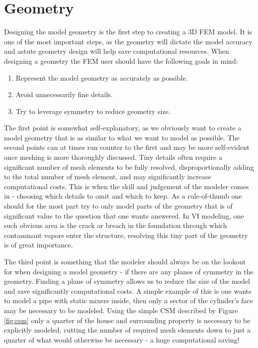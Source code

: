 \section{Geometry}

Designing the model geometry is the first step to creating a 3D FEM model.
It is one of the most important steps, as the geometry will dictate the model accuracy and astute geometry design will help save computational resources.
When designing a geometry the FEM user should have the following goals in mind:
\begin{enumerate}
  \item Represent the model geometry as accurately as possible.
  \item Avoid unnecessarily fine details.
  \item Try to leverage symmetry to reduce geometry size.
\end{enumerate}\par

The first point is somewhat self-explanatory, as we obviously want to create a model geometry that is as similar to what we want to model as possible.
The second points can at times run counter to the first and may be more self-evident once meshing is more thoroughly discussed.
Tiny details often require a significant number of mesh elements to be fully resolved, disproportionally adding to the total number of mesh element, and may significantly increase computational costs.
This is when the skill and judgement of the modeler comes in - choosing which details to omit and which to keep.
As a rule-of-thumb one should for the most part try to only model parts of the geometry that is of significant value to the question that one wants answered.
In VI modeling, one such obvious area is the crack or breach in the foundation through which contaminant vapors enter the structure, resolving this tiny part of the geometry is of great importance.\par

The third point is something that the modeler should always be on the lookout for when designing a model geometry - if there are any planes of symmetry in the geometry.
Finding a plane of symmetry allows us to reduce the size of the model and save significantly computational costs.
A simple example of this is one wants to model a pipe with static mixers inside, then only a sector of the cylinder's face may be necessary to be modeled.
Using the simple CSM described by Figure \ref{fig:csm} only a quarter of the house and surrounding property is necessary to be explicitly modeled, cutting the number of required mesh elements down to just a quarter of what would otherwise be necessary - a huge computational saving!\par

